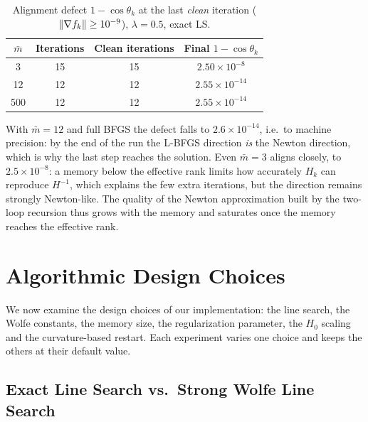 \begin{table}[H]
\centering
\caption{Alignment defect $1 - \cos\theta_k$ at the last \emph{clean}
  iteration ($\left\|\nabla f_k\right\| \geq 10^{-9}$), $\lambda = 0.5$, exact LS.}
\label{tab:newton_angle}
\small
\setlength{\tabcolsep}{12pt}
\begin{tabular}{cccc}
    \toprule
    $\bar{m}$ & \textbf{Iterations} & \textbf{Clean iterations}
      & \textbf{Final} $1 - \cos\theta_k$ \\
    \midrule
    3   & 15 & 15 & $2.50 \times 10^{-8}$  \\
    12  & 12 & 12 & $2.55 \times 10^{-14}$ \\
    500 & 12 & 12 & $2.55 \times 10^{-14}$ \\
    \bottomrule
\end{tabular}
\end{table}

\noindent With $\bar{m} = 12$ and full BFGS the defect falls to
$2.6 \times 10^{-14}$, i.e.\ to machine precision: by the end of the run the
L-BFGS direction \emph{is} the Newton direction, which is why the last step
reaches the solution. Even $\bar{m} = 3$ aligns closely, to
$2.5 \times 10^{-8}$: a memory below the effective rank limits how accurately
$H_k$ can reproduce $H^{-1}$, which explains the few extra iterations, but
the direction remains strongly Newton-like. The quality of the Newton
approximation built by the two-loop recursion thus grows with the memory and
saturates once the memory reaches the effective rank.


\section{Algorithmic Design Choices}
\label{sec:exp_design}

\noindent We now examine the design choices of our implementation: the line
search, the Wolfe constants, the memory size, the regularization parameter,
the $H_0$ scaling and the curvature-based restart. Each experiment varies one
choice and keeps the others at their default value.


\subsection{Exact Line Search vs.\ Strong Wolfe Line Search}
\label{sec:exp_exact_vs_wolfe}

